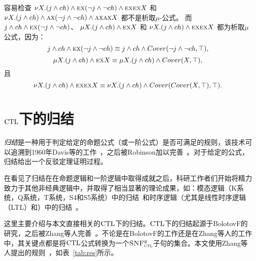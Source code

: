 \begin{example}\label{exmp:disF}
	容易检查 $\nu X. (j \wedge ch) \wedge \textsc{e}\textsc{x} (\neg j \wedge \neg ch) \wedge \textsc{e}\textsc{x} \textsc{e}\textsc{x} X$ 和  $\nu X. (j \wedge ch) \wedge \textsc{a}\textsc{x} (\neg j \wedge \neg ch) \wedge \textsc{a}\textsc{x} \textsc{a}\textsc{x} X$ 都不是析取$\mu$-公式。
	而 $j \wedge ch \wedge \textsc{e}\textsc{x} (\neg j \wedge \neg ch)$、 $\mu X. (j \wedge ch) \wedge \textsc{e}\textsc{x} X$ 和 $\nu X. (j \wedge ch) \wedge \textsc{e}\textsc{x} \textsc{e}\textsc{x} X$ 都为析取$\mu$公式，因为：
	\[
	j \wedge ch \wedge \textsc{e}\textsc{x} (\neg j \wedge \neg ch) \equiv j \wedge ch \wedge Cover(\neg j \wedge \neg ch, \top),
	\]
	\[
	\mu X. (j \wedge ch) \wedge \textsc{e}\textsc{x} X \equiv  \mu X. (j \wedge ch) \wedge Cover(X, \top),
	\] 且
	\[
	\nu X. (j \wedge ch) \wedge \textsc{e}\textsc{x} \textsc{e}\textsc{x} X \equiv \nu X. (j \wedge ch) \wedge Cover(Cover(X, \top), \top).
	\]
	
\end{example}

\section{$\textrm{CTL}$下的归结}\label{chapter02:CTLres}

\emph{归结}是一种用于判定给定的命题公式（或一阶公式）是否可满足的规则，该技术可以追溯到1960年Davis等的工作~\cite{DBLP:journals/jacm/DavisP60}，之后被Robinson加以完善~\cite{DBLP:journals/jacm/Robinson65}。对于给定的公式，归结给出一个反驳定理证明过程。

在看见了归结在在命题逻辑和一阶逻辑中取得成就之后，科研工作者们开始将精力致力于其他非经典逻辑中，并取得了相当显著的理论成果，如：模态逻辑（K系统，Q系统，T系统，S4和S5系统）中的归结~\cite{DBLP:journals/tcs/EnjalbertC89}和时序逻辑（尤其是线性时序逻辑（LTL）和\CTL）中的归结~\cite{DBLP:conf/cade/CavalliC84,DBLP:journals/jetai/BolotovF99}。

这里主要介绍与本文直接相关的$\textrm{CTL}$下的归结。$\textrm{CTL}$下的归结起源于BolotovF的研究\cite{DBLP:journals/jetai/BolotovF99}，之后被Zhang等人完善~\cite{zhang2014resolution}。不论是在BolotovF的工作还是在Zhang等人的工作中，其关键点都是将$\textrm{CTL}$公式转换为一个${\textsc{SNF}_{\textsc{ctl}}^g}$子句的集合。本文使用Zhang等人提出的规则~\cite{zhang2014resolution}，如表~\ref{tab:res}所示。

